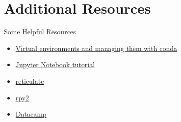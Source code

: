 \documentclass[10pt, aspectratio=169]{beamer}
\begin{document}
{ 	\section{Additional Resources}
	\begin{frame}{Some Helpful Resources}
		\begin{itemize}
		    \item \href{https://www.freecodecamp.org/news/why-you-need-python-environments-and-how-to-manage-them-with-conda-85f155f4353c}{Virtual environments and managing them with conda}
            \item \href{https://www.youtube.com/watch?v=HW29067qVWk}{Jupyter Notebook tutorial}
            \item \href{https://www.youtube.com/watch?v=U3ByGh8RmSc}{reticulate}
            \item \href{https://rpy2.github.io/doc/latest/html/introduction.html}{rpy2}
            \item \href{https://datacamp.com}{Datacamp}
		\end{itemize}
	\end{frame}
	
	
	}
\end{document}
